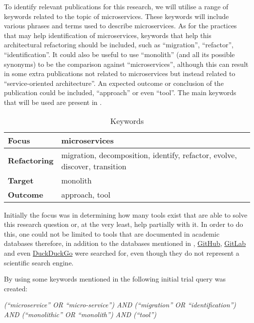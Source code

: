 To identify relevant publications for this research, we will utilise a range of
keywords related to the topic of microservices. These keywords will include
various phrases and terms used to describe microservices. As for the practices
that may help identification of microservices, keywords that help this
architectural refactoring should be included, such as ``migration'',
``refactor'', ``identification''. It could also be useful to use ``monolith'' (and
all its possible synonyms) to be the comparison against ``microservices'',
although this can result in some extra publications not related to
microservices but instead related to ``service-oriented architecture''. An
expected outcome or conclusion of the publication could be included,
``approach'' or even ``tool''. The main keywords that will be used are present in
.

\begin{table}[!htb] \caption{Keywords} \label{tab:keywords}
  \begin{center}
    \begin{tabular}[c]{p{7em}|p{13em}} {\textbf{Focus}} & microservices \\
      \hline \textbf{Refactoring} & {migration, decomposition, identify, refactor, evolve, discover, transition } \\
      \hline \textbf{Target} & monolith \\
      \hline \textbf{Outcome} & approach, tool \\
    \end{tabular}
  \end{center}
\end{table}

Initially the focus was in determining how many tools exist that are able to
solve this research question or, at the very least, help partially with it. In
order to do this, one could not be limited to tools that are documented in
academic databases therefore, in addition to the databases mentioned in
, \href{https://github.com}{GitHub},
\href{https://gitlab.com}{GitLab} and even
\href{https://duckduckgo.org}{DuckDuckGo} were searched for, even though they
do not represent a scientific search engine.

By using some keywords mentioned in  the following
initial trial query was created:

\begin{center}
  \emph{(``microservice'' OR ``micro-service'') AND (``migration'' OR
  ``identification'') AND (``monolithic'' OR ``monolith'') AND (``tool'')}
\end{center}

